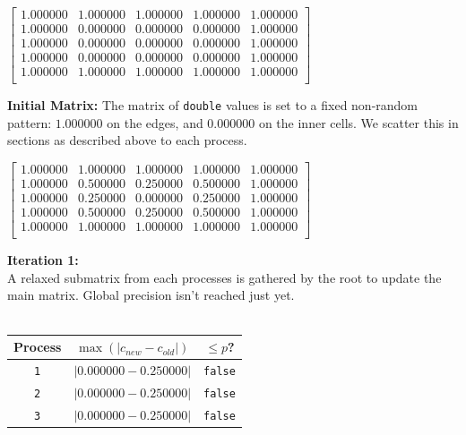 \documentclass[11pt]{article}
\begin{document}
\hspace{-0.2cm}\begin{minipage}{0.47\textwidth}
$
\begin{bmatrix}
1.000000 & 1.000000 & 1.000000 & 1.000000 & 1.000000 \\
1.000000 & 0.000000 & 0.000000 & 0.000000 & 1.000000 \\
1.000000 & 0.000000 & 0.000000 & 0.000000 & 1.000000 \\
1.000000 & 0.000000 & 0.000000 & 0.000000 & 1.000000 \\
1.000000 & 1.000000 & 1.000000 & 1.000000 & 1.000000 \\
\end{bmatrix}
$
\end{minipage}\hspace{1.8cm}{\color{cyan!90}\vline}\hspace{0.5cm}
\begin{minipage}{.47\textwidth}
\vspace{-1em}
\textbf{Initial Matrix:} The matrix of \texttt{double} values is set to a fixed non-random pattern: $1.000000$ on the edges, and $0.000000$ on the inner cells. We scatter this in sections as described above to each process.
\vspace{-1em}
\end{minipage}

\hspace{-0.2cm}\begin{minipage}{0.47\textwidth}
$
\begin{bmatrix}
1.000000 & 1.000000 & 1.000000 & 1.000000 & 1.000000 \\
1.000000 & 0.500000 & 0.250000 & 0.500000 & 1.000000 \\
1.000000 & 0.250000 & 0.000000 & 0.250000 & 1.000000 \\
1.000000 & 0.500000 & 0.250000 & 0.500000 & 1.000000 \\
1.000000 & 1.000000 & 1.000000 & 1.000000 & 1.000000 \\
\end{bmatrix}
$
\end{minipage}\hspace{1.8cm}{\color{cyan!90}\vline}\hspace{0.5cm}
\begin{minipage}{.47\textwidth}\textbf{Iteration 1:}\\
A relaxed submatrix from each processes is gathered by the root to update the main matrix. Global precision isn't reached just yet.
\\
\\
\begin{tabular}{|c|c|c|}
\hline
\textbf{Process} & \textbf{$\max(|c_{new}-c_{old}|)$} & \textbf{$\leq p$?} \\
\hline
\texttt{1} & $|0.000000-0.250000|$ & {\color{red}\texttt{false}}\\
\texttt{2} & $|0.000000-0.250000|$ & {\color{red}\texttt{false}}\\
\texttt{3} & $|0.000000-0.250000|$ & {\color{red}\texttt{false}}\\
\hline
\end{tabular}
\end{minipage}
\end{document}
